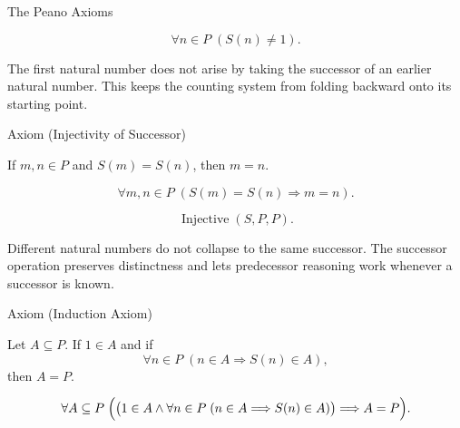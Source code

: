 \begin{topicbox}{The Peano Axioms}
\begin{remark*}
\[
\forall n \in P\;(S(n) \neq 1).
\]
\end{remark*}

\begin{remark*}[Interpretation]
The first natural number does not arise by taking the successor of an earlier
natural number. This keeps the counting system from folding backward onto its
starting point.
\end{remark*}

\NoLocalDependencies

\begin{axiombox}{Axiom (Injectivity of Successor)}
\begin{axiom}
\label{ax:peano-successor-injective}
If $m,n \in P$ and $S(m)=S(n)$, then $m=n$.
\end{axiom}
\end{axiombox}

\begin{remark*}
\[
\forall m,n \in P\;(S(m)=S(n) \Longrightarrow m=n).
\]
\end{remark*}

\begin{remark*}
\[
\operatorname{Injective}(S,P,P).
\]
\end{remark*}

\begin{remark*}[Interpretation]
Different natural numbers do not collapse to the same successor. The successor
operation preserves distinctness and lets predecessor reasoning work whenever a
successor is known.
\end{remark*}

\NoLocalDependencies

\begin{axiombox}{Axiom (Induction Axiom)}
\begin{axiom}
\label{ax:peano-induction}
Let $A \subseteq P$. If $1 \in A$ and if
\[
\forall n \in P\;(n \in A \Longrightarrow S(n) \in A),
\]
then $A=P$.
\end{axiom}
\end{axiombox}

\begin{remark*}
\[
\forall A \subseteq P\;
\Bigl(\bigl(1 \in A \land
\forall n \in P\;(n \in A \Longrightarrow S(n) \in A)\bigr)
\Longrightarrow A=P\Bigr).
\]
\end{remark*}


\end{topicbox}
